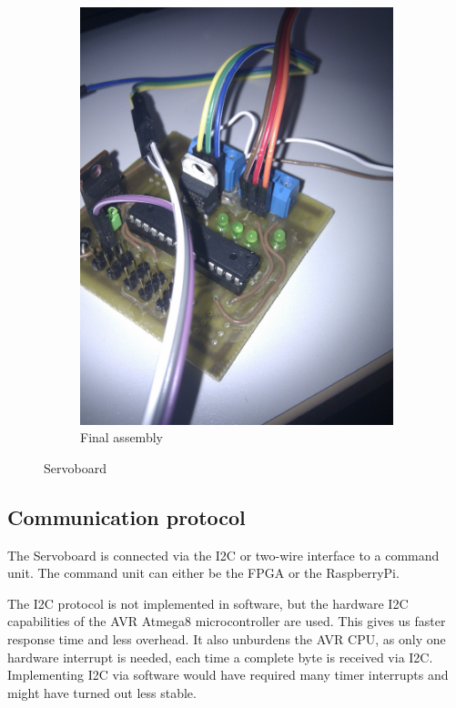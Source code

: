 \documentclass[a4paper
               ,10pt
               ,DIV=10 %
               ,BCOR=0.3cm
               ,pagesize %
               ,headings=small
               ,bibtotoc
               ]
               {scrartcl}
\begin{document}
\begin{figure}[H]
  \begin{subfigure}[b]{0.3\textwidth}
    \centering
    \includegraphics[width=\textwidth]{pic/servoboardr.jpg}
    \caption{Final assembly}
  \end{subfigure}
  \caption{Servoboard}
  \label{figservoboardbrd}
\end{figure}
\subsection{Communication protocol}
The Servoboard is connected via the I2C or two-wire interface to a command unit.
The command unit can either be the FPGA or the RaspberryPi.


The I2C protocol is not implemented in software, but the hardware I2C capabilities of the AVR Atmega8 microcontroller are used.
This gives us faster response time and less overhead.
It also unburdens the AVR CPU, as only one hardware interrupt is needed, each time a complete byte is received via I2C.
Implementing I2C via software would have required many timer interrupts and might have turned out less stable.
\end{document}
